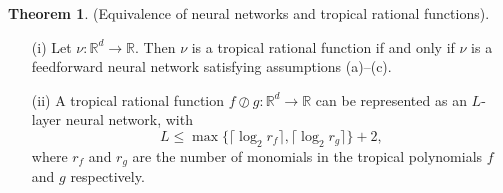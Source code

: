 \documentclass{article}
\theoremstyle{definition}
\newtheorem{theorem}{Theorem}[section]
\begin{document}
\begin{theorem}\hspace{1sp}\cite{zhang2018tropical}
\label{theo:network_eq_rat_fnkt}
(Equivalence of neural networks and tropical
rational functions).
\begin{itemize}
\item[(i)]
Let $\nu : \mathbb{R}^{d} \to \mathbb{R}$. Then $\nu$ is a tropical rational function if and only if $\nu$ is a feedforward neural network satisfying assumptions (a)–(c).
\item[(ii)]
A tropical rational function $f \oslash g: \mathbb{R}^{d} \to \mathbb{R}$ can be represented as an $L$-layer neural network, with
$$ L \leq \max \{ \lceil \log_2 r_f \rceil, \lceil \log_2 r_g \rceil \} + 2,$$
where $r_f$ and $r_g$ are the number of monomials in the tropical polynomials $f$ and $g$ respectively.
\end{itemize}
\end{theorem}
\end{document}
